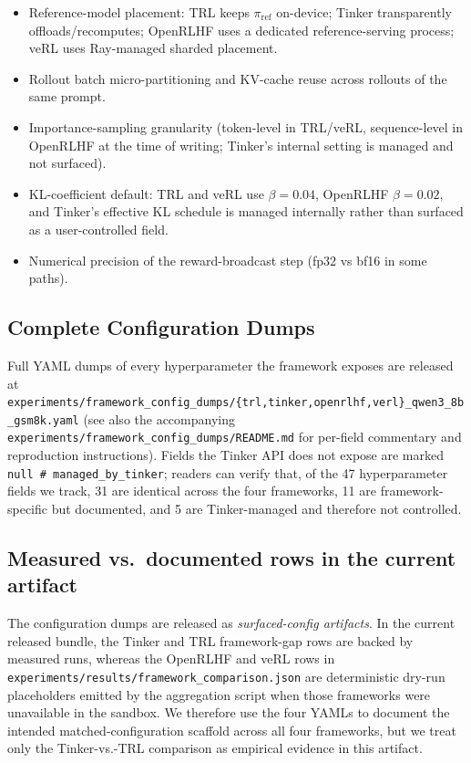 \begin{itemize}[leftmargin=1.2em,itemsep=1pt]
  \item Reference-model placement: TRL keeps $\pi_\text{ref}$ on-device;
        Tinker transparently offloads/recomputes; OpenRLHF uses a
        dedicated reference-serving process; veRL uses Ray-managed
        sharded placement.
  \item Rollout batch micro-partitioning and KV-cache reuse across
        rollouts of the same prompt.
  \item Importance-sampling granularity (token-level in TRL/veRL,
        sequence-level in OpenRLHF at the time of writing; Tinker's
        internal setting is managed and not surfaced).
  \item KL-coefficient default: TRL and veRL use $\beta=0.04$,
        OpenRLHF $\beta=0.02$, and Tinker's effective KL schedule is
        managed internally rather than surfaced as a user-controlled field.
  \item Numerical precision of the reward-broadcast step (fp32 vs
        bf16 in some paths).
\end{itemize}

\subsection{Complete Configuration Dumps}

Full YAML dumps of every hyperparameter the framework exposes are
released at
\texttt{experiments/framework\_config\_dumps/\{trl,tinker,openrlhf,verl\}\_qwen3\_8b\_gsm8k.yaml}
(see also the accompanying
\texttt{experiments/framework\_config\_dumps/README.md} for per-field
commentary and reproduction instructions).
Fields the Tinker API does not expose are marked
\texttt{null\ \#\ managed\_by\_tinker}; readers can verify that, of
the 47 hyperparameter fields we track, 31 are identical across the
four frameworks, 11 are framework-specific but documented, and 5 are
Tinker-managed and therefore not controlled.

\subsection{Measured vs.\ documented rows in the current artifact}

The configuration dumps are released as \emph{surfaced-config artifacts}.
In the current released bundle, the Tinker and TRL framework-gap rows are
backed by measured runs, whereas the OpenRLHF and veRL rows in
\texttt{experiments/results/framework\_comparison.json} are deterministic
dry-run placeholders emitted by the aggregation script when those
frameworks were unavailable in the sandbox. We therefore use the four YAMLs
to document the intended matched-configuration scaffold across all four
frameworks, but we treat only the Tinker-vs.-TRL comparison as empirical
evidence in this artifact.

